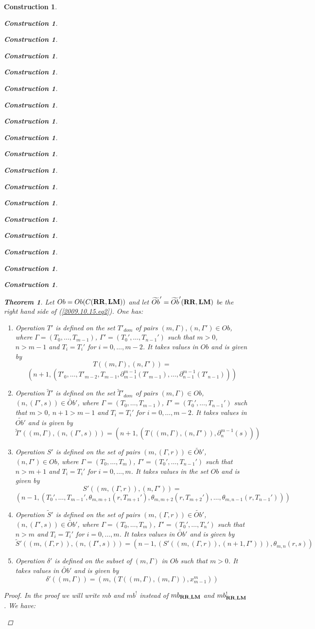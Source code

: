\documentclass[12pt]{amsart}
\newtheorem{theorem}[proposition]{Theorem}
\newtheorem{construction}[proposition]{Construction}
\newcommand{\llabel}[1]{\label{#1}}
\newcommand{\wt}{\widetilde}
\newcommand{\RR}{{\bf RR}}
\newcommand{\LM}{{\bf LM}}
\begin{document}
\begin{construction}
\begin{construction}
\begin{construction}
\begin{construction}
\begin{construction}
\begin{construction}
\begin{construction}
\begin{construction}
\begin{construction}
\begin{construction}
\begin{construction}
\begin{construction}
\begin{construction}
\begin{construction}
\begin{construction}
\begin{construction}
\begin{construction}
\begin{construction}
  
%
\begin{theorem}\llabel{2015.08.26.th2}
Let $Ob=Ob(C(\RR,\LM))$ and let $\wt{Ob}'=\wt{Ob}'(\RR,\LM)$ be the right hand side of (\ref{2009.10.15.eq2}). One has:
%
\begin{enumerate}
\item Operation $T'$ is defined on the set $T'_{dom}$ of pairs
  $(m,\Gamma),(n,\Gamma')\in Ob$, where $\Gamma=(T_0,\dots,T_{m-1})$,
  $\Gamma'=(T_0',\dots,T_{n-1}')$ such that $m>0$, $n>m-1$ and $T_i=T_i'$ for
  $i=0,\dots,m-2$. It takes values in $Ob$ and is given by
%
$$T((m,\Gamma),(n,\Gamma'))=$$$$(n+1,(T'_0,\dots,T'_{m-2},T_{m-1},\partial_{m-1}^{m-1}(T'_{m-1}),\dots,\partial_{n-1}^{m-1}(T'_{n-1})))$$
%
\item Operation $\wt{T}'$ is defined on the set $\wt{T}'_{dom}$ of pairs
  $(m,\Gamma)\in Ob$, $(n,(\Gamma',s))\in\wt{Ob}'$, where
  $\Gamma=(T_0,\dots,T_{m-1})$, $\Gamma'=(T_0',\dots,T_{n-1}')$ such that
  $m>0$, $n+1>m-1$ and $T_i=T_i'$ for $i=0,\dots,m-2$. It takes values in
  $\wt{Ob'}$ and is given by
%
$$\wt{T}'((m,\Gamma),(n,(\Gamma',s)))=(n+1,(T((m,\Gamma),(n,\Gamma')),\partial_{n}^{m-1}(s)))$$
%
\item Operation $S'$ is defined on the set of pairs $(m,(\Gamma,r))\in
  \wt{Ob}'$, $(n,\Gamma')\in Ob$, where $\Gamma=(T_0,\dots,T_{m})$,
  $\Gamma'=(T_0',\dots,T_{n-1}')$ such that $n>m+1$ and $T_i=T_i'$ for
  $i=0,\dots,m$. It takes values in the set $Ob$ and is given by
%
$$S'((m,(\Gamma,r)),(n,\Gamma'))=$$$$(n-1,(T_0',\dots,T_{m-1}',\theta_{m,m+1}(r,T_{m+1}'),\theta_{m,m+2}(r,T_{m+2}'),\dots,\theta_{m,n-1}(r,T_{n-1}')))$$
%
\item Operation $\wt{S}'$ is defined on the set of pairs $(m,(\Gamma,r))\in
  \wt{Ob}'$, $(n,(\Gamma',s))\in \wt{Ob}'$, where $\Gamma=(T_0,\dots,T_{m})$,
  $\Gamma'=(T_0',\dots,T_{n}')$ such that $n>m$ and $T_i=T_i'$ for
  $i=0,\dots,m$. It takes values in $\wt{Ob}'$ and is given by
%
$$\wt{S}'((m,(\Gamma,r)),(n,(\Gamma',s)))=(n-1,(S'((m,(\Gamma,r)),(n+1,\Gamma'))),\theta_{m,n}(r,s))$$
%
\item Operation $\delta'$ is defined on the subset of $(m,\Gamma)$ in $Ob$ such
  that $m>0$. It takes values in $\wt{Ob}'$ and is given by
%
$$\delta'((m,\Gamma))=(m,(T((m,\Gamma),(m,\Gamma)),x_{m-1}^m))$$
%
\end{enumerate}
\end{theorem}
%
\begin{proof}
In the proof we will write $mb$ and $mb^!$ instead of $mb_{\RR,\LM}$ and
$mb^!_{\RR,\LM}$. We have:
%
\begin{enumerate}

\end{enumerate}
\end{proof}
\end{construction}
\end{construction}
\end{construction}
\end{construction}
\end{construction}
\end{construction}
\end{construction}
\end{construction}
\end{construction}
\end{construction}
\end{construction}
\end{construction}
\end{construction}
\end{construction}
\end{construction}
\end{construction}
\end{construction}
\end{construction}
\end{document}
